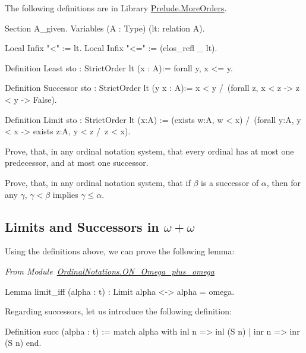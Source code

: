 The following definitions are in Library \href{../theories/html/hydras.Prelude.MoreOrders.html}{Prelude.MoreOrders}.

\begin{Coqsrc}
Section A_given.
  Variables (A : Type)  (lt: relation A).
  
Local Infix "<" := lt.
Local Infix "<=" := (clos_refl _ lt).

Definition Least {sto : StrictOrder lt} (x : A):=
  forall y,  x <= y.

Definition Successor {sto : StrictOrder lt} (y x : A):=
  x < y /\ (forall z,  x < z ->  z <  y -> False).

Definition Limit {sto : StrictOrder lt}  (x:A)  :=
  (exists w:A,  w < x) /\
  (forall y:A, y < x -> exists z:A, y < z /\ z < x).
\end{Coqsrc}

\begin{exercise}
Prove, that, in any ordinal notation system, that every ordinal has at most one predecessor, and at most one successor. 
\end{exercise}

\begin{exercise}
Prove, that, in any ordinal notation system, that if $\beta$ is a successor of $\alpha$,
then for any $\gamma$, $\gamma<\beta$ implies 
$\gamma\leq\alpha$.
\end{exercise}




\subsection{Limits and Successors in \texorpdfstring{$\omega+\omega$}{omega+omega}}

Using the definitions above, we can prove the following lemma:

\vspace{4pt}

\noindent\emph{From Module~\href{../theories/html/hydras.OrdinalNotations.ON_Omega_plus_omega.html}{OrdinalNotations.ON\_Omega\_plus\_omega}}

\begin{Coqsrc}
Lemma limit_iff (alpha : t) : Limit alpha <-> alpha = omega.
\end{Coqsrc}

Regarding successors, let us introduce the following definition:

\begin{Coqsrc}
Definition succ (alpha : t) :=
  match alpha with
    inl n => inl (S n)
  | inr n => inr (S n)
  end.
\end{Coqsrc}


